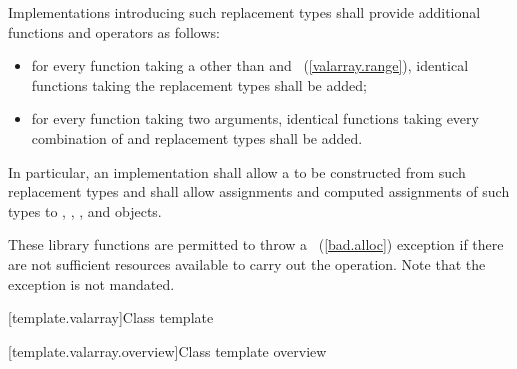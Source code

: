 \pnum
Implementations introducing such replacement types shall provide
additional functions and operators as follows:
\begin{itemize}
\item
for every function taking a
 other than  and
~(\ref{valarray.range}),
identical functions taking the replacement types shall be added;
\item
for every function taking two
arguments, identical functions taking every combination of
and replacement types shall be added.
\end{itemize}

\pnum
In particular, an implementation shall allow a
to be constructed from such replacement types and shall allow assignments
and computed assignments of such types to
,
,
,
and
objects.

\pnum
These library functions are permitted to throw a
~(\ref{bad.alloc}) exception if there are not sufficient resources available
to carry out the operation.
Note that the exception is not mandated.

[template.valarray]{Class template }

[template.valarray.overview]{Class template  overview}


